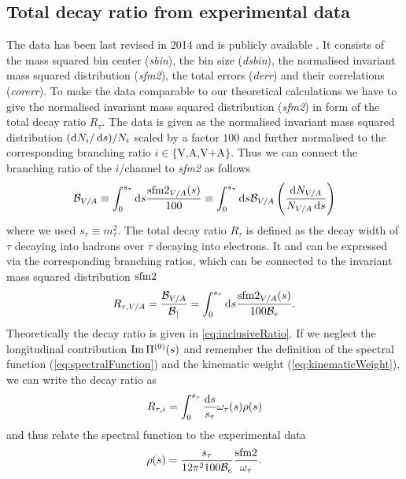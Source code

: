 \documentclass[../../index.tex]{subfiles}
\begin{document}
\subsection{Total decay ratio from experimental data}
The data has been last revised in 2014 \cite{Davier2014} and is publicly
available \cite{AlephData}. It consists of the mass squared bin center
(\textit{sbin}), the bin size (\textit{dsbin}), the normalised invariant mass
squared distribution (\textit{sfm2}), the total errors (\textit{derr}) and their
correlations (\textit{corerr}). To make the data comparable to our theoretical
calculations we have to give the normalised invariant mass squared distribution
(\textit{sfm2}) in form of the total decay ratio \(R_\tau\). The data is given
as the normalised invariant mass squared distribution \((\dif N_i/\dif s)/N_i\)
scaled by a factor \(100\) and further normalised to the corresponding branching
ratio \(i\in\{\text{V,A,V+A}\}\). Thus we can connect the branching ratio of the
\(i\)\-/channel to \textit{sfm2} as follows
\begin{equation}
  \mathcal{B}_{V/A} \equiv \int_0^{s_\tau} \dif s \frac{\sfm2_{V/A}(s)}{100}
  \equiv \int_0^{s_\tau} \dif s \mathcal{B}_{V/A}
  \left( \frac{\dif N_{V/A}}{N_{V/A}\dif s} \right)
\end{equation}
where we used \(s_\tau \equiv m_\tau^2\). The total decay ratio \(R_\tau\) is
defined as the decay width of \(\tau\) decaying into hadrons over \(\tau\)
decaying into electrons. It and can be expressed via the corresponding branching
ratios, which can be connected to the invariant mass squared distribution
\(\sfm2\)
\begin{equation}
  R_{\tau, V/A} = \frac{\mathcal{B}_{V/A}}{\mathcal{B_e}}
  = \int_0^{s_\tau} \dif s \frac{\sfm2_{V/A}(s)}{100 \mathcal{B}_e}.
\end{equation}
Theoretically the decay ratio is given in \cref{eq:inclusiveRatio}. If we
neglect the longitudinal contribution \(\operatorname{Im} \Pi^{(0)}(s)\) and remember the
definition of the spectral function (\cref{eq:spectralFunction}) and the
kinematic weight (\cref{eq:kinematicWeight}), we can write the decay ratio as
\begin{equation}
  R_{\tau, i} = \int_0^{s_\tau} \frac{\dif s}{s_\tau} \omega_\tau(s) \rho(s)
\end{equation}
and thus relate the spectral function to the experimental data
\begin{equation}
  \rho(s) = \frac{s_\tau}{12 \pi^2 100 \mathcal{B}_e} \frac{\sfm2}{\omega_\tau}.
\end{equation}
\end{document}
